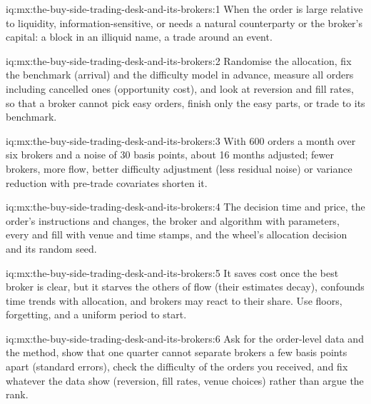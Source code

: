 \begin{solution}{iq:mx:the-buy-side-trading-desk-and-its-brokers:1}
When the order is large relative to liquidity, information-sensitive, or needs a natural counterparty or the broker's capital: a block in an
illiquid name, a trade around an event.
\end{solution}

\begin{solution}{iq:mx:the-buy-side-trading-desk-and-its-brokers:2}
Randomise the allocation, fix the benchmark (arrival) and the difficulty model in advance, measure all orders including cancelled ones (opportunity
cost), and look at reversion and fill rates, so that a broker cannot pick easy orders, finish only the easy parts, or trade to its benchmark.
\end{solution}

\begin{solution}{iq:mx:the-buy-side-trading-desk-and-its-brokers:3}
With 600 orders a month over six brokers and a noise of 30 basis points, about 16 months adjusted; fewer brokers, more flow, better difficulty
adjustment (less residual noise) or variance reduction with pre-trade covariates shorten it.
\end{solution}

\begin{solution}{iq:mx:the-buy-side-trading-desk-and-its-brokers:4}
The decision time and price, the order's instructions and changes, the broker and algorithm with parameters, every  and fill with venue
and time stamps, and the wheel's allocation decision and its random seed.
\end{solution}

\begin{solution}{iq:mx:the-buy-side-trading-desk-and-its-brokers:5}
It saves cost once the best broker is clear, but it starves the others of flow (their estimates decay), confounds time trends with allocation, and
brokers may react to their share. Use floors, forgetting, and a uniform period to start.
\end{solution}

\begin{solution}{iq:mx:the-buy-side-trading-desk-and-its-brokers:6}
Ask for the order-level data and the method, show that one quarter cannot separate brokers a few basis points apart (standard errors), check the
difficulty of the orders you received, and fix whatever the data show (reversion, fill rates, venue choices) rather than argue the rank.
\end{solution}
